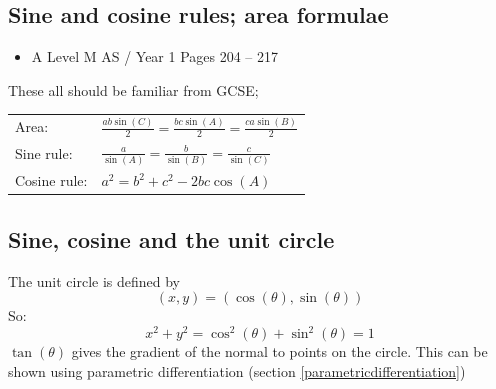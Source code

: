\documentclass[11pt, a4paper]{article}
\begin{document}
\vspace{0.5cm}


\subsection{Sine and cosine rules; area formulae}
\begin{itemize}
\item A Level M AS / Year 1 \hspace{1cm} \phantom{ } Pages 204 -- 217
\end{itemize} \par
These all should be familiar from GCSE;

\begin{table}[H]
\renewcommand{\arraystretch}{1.25}
\begin{tabular}{ll}
Area: & $\frac{ab\sin(C)}{2}=\frac{bc\sin(A)}{2}=\frac{ca\sin(B)}{2}$ \\
Sine rule: & $\frac{a}{\sin(A)}=\frac{b}{\sin(B)}=\frac{c}{\sin(C)}$ \\
Cosine rule: & $a^{2} = b^{2} + c^{2} - 2bc\cos(A)$ \\
\end{tabular}
\end{table}
\vspace{0.5cm}


\subsection{Sine, cosine and the unit circle}
The unit circle is defined by
\begin{equation*}
(x,y)=(\cos(\theta),\sin(\theta))
\end{equation*}
So:
\begin{equation*}
x^{2}+y^{2}=\cos^{2}(\theta)+\sin^{2}(\theta)=1
\end{equation*}
$\tan(\theta)$ gives the gradient of the normal to points on the circle. This can be shown using parametric differentiation (section \ref{parametricdifferentiation})

\vspace{0.5cm}
\end{document}
